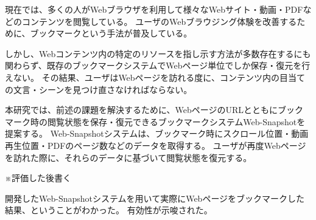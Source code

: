 \begin{jabstract}

  現在では、多くの人がWebブラウザを利用して様々なWebサイト・動画・PDFなどのコンテンツを閲覧している。
  ユーザのWebブラウジング体験を改善するために、ブックマークという手法が普及している。

  しかし、Webコンテンツ内の特定のリソースを指し示す方法が多数存在するにも関わらず、既存のブックマークシステムでWebページ単位でしか保存・復元を行えない。
  その結果、ユーザはWebページを訪れる度に、コンテンツ内の目当ての文言・シーンを見つけ直さなければならない。

  本研究では、前述の課題を解決するために、WebページのURLとともにブックマーク時の閲覧状態を保存・復元できるブックマークシステムWeb-Snapshotを提案する。
  Web-Snapshotシステムは、ブックマーク時にスクロール位置・動画再生位置・PDFのページ数などのデータを取得する。
  ユーザが再度Webページを訪れた際に、それらのデータに基づいて閲覧状態を復元する。

  ※評価した後書く
  
  開発したWeb-Snapshotシステムを用いて実際にWebページをブックマークした結果、ということがわかった。
  有効性が示唆された。

\end{jabstract}
